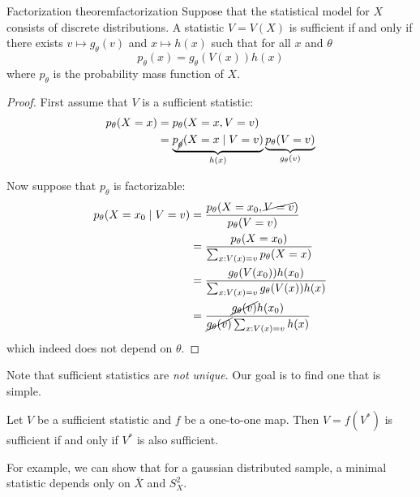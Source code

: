 \documentclass[12pt]{extarticle}
\begin{document}
\begin{theorem}{Factorization theorem}{factorization}
	Suppose that the statistical model for $X$ consists of discrete distributions.
	A statistic $V = V(X)$ is sufficient if and only if there exists $v \mapsto g_\theta(v)$ and $x \mapsto h(x)$
	such that for all $x$ and $\theta$
	\begin{equation}
		p_\theta(x) = g_\theta (V(x)) h(x)
	\end{equation}
	where $p_\theta$ is the probability mass function of $X$.
\end{theorem}

\begin{proof}
	First assume that $V$ is a sufficient statistic:
	\begin{align}
		p_\theta(X = x) & = p_\theta(X = x, V = v)                                                                               \\
		                & = \underbrace{p_{\cancel{\theta}}(X = x \mid V = v)}_{h(x)} \underbrace{p_\theta(V = v)}_{g_\theta(v)}
	\end{align}

	Now suppose that $p_\theta$ is factorizable:
	\begin{align}
		p_\theta(X = x_0 \mid V = v) & = \frac{p_\theta(X = x_0, \cancel{V = v})}{p_\theta(V = v)}                        \\
		                             & = \frac{p_\theta (X = x_0)}{\sum_{x: V(x) = v} p_\theta (X = x)}                   \\
		                             & = \frac{g_\theta(V(x_0)) h(x_0)}{\sum_{x: V(x) = v} g_\theta(V(x)) h(x)}           \\
		                             & = \frac{\cancel{g_\theta(v)} h(x_0)}{\cancel{g_\theta(v)} \sum_{x: V(x) = v} h(x)}
	\end{align}
	which indeed does not depend on $\theta$.
\end{proof}

Note that sufficient statistics are \emph{not unique}.
Our goal is to find one that is simple.

\begin{lemma}{}{}
	Let $V$ be a sufficient statistic and $f$ be a one-to-one map.
	Then $V = f(V^*)$ is sufficient if and only if $V^*$ is also sufficient.
\end{lemma}

For example, we can show that for a gaussian distributed sample,
a minimal statistic depends only on $\bar X$ and $S_X^2$.
\end{document}
